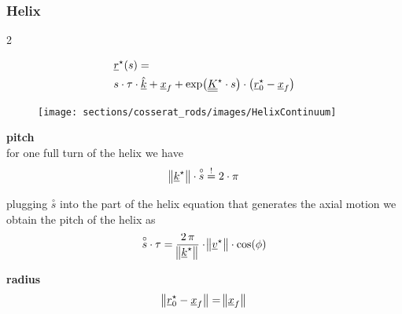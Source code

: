 \begin{frame}
  \frametitle{Helix}

  \vspace{-1em}
  \begin{multicols}{2}
    \noindent
    
    \begin{displaymath}
      \begin{alignedat}{1}
        &\underline{r}^{\star}(s) = \\
        &s \cdot \tau \cdot \underline{\hat{k}} +
        \underline{x}_f + \exp \bigl( \underline{\underline{K}}^{\star} \cdot s \bigr) \cdot \bigl( \underline{r}^{\star}_0 - \underline{x}_f \bigr)  
      \end{alignedat}
    \end{displaymath}

    \begin{figure}
      \centering
      \texttt{[image: sections/cosserat\_rods/images/HelixContinuum]}
    \end{figure}
    
    \textbf{pitch} \\
    for one full turn of the helix we have
    \begin{displaymath}
      \norm[1]{\underline{k}^{\star}} \cdot \overset{\circ}{s} \overset{!}{=} 2 \cdot \pi
    \end{displaymath}
    
    plugging $\overset{\circ}{s}$ into the part of the helix equation that generates the axial motion we obtain the pitch of the helix as
    \begin{displaymath}
      \overset{\circ}{s} \cdot \tau = \frac{2 \, \pi}{\norm[1]{\underline{k}^{\star}}} \cdot \norm[1]{\underline{v}^{\star}} \cdot \cos(\phi)
    \end{displaymath}
    
    \vspace{1em}
    \textbf{radius}
    \begin{displaymath}
      \norm[1]{\underline{r}^{\star}_0 - \underline{x}_f} =
      \norm[1]{\underline{x}_f}
    \end{displaymath}
    
  \end{multicols}

\end{frame}






